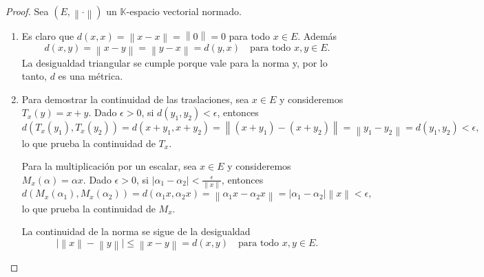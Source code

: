 \documentclass{article}
\theoremstyle{definition}
\newcommand{\norm}[1]{\left\lVert #1 \right\rVert}       %
\newcommand{\EN}[1][E]{(#1,\norm{\cdot})}                 %
\begin{document}
\begin{proof}
    Sea \( \EN \) un \( \mathbb{K} \)-espacio vectorial normado.
    \begin{enumerate}
        \item Es claro que \( d(x, x) = \norm{x-x} = \norm{0} = 0 \) para todo \( x \in E \). Además \[
                  d(x, y) = \norm{x-y} = \norm{y-x} = d(y, x) \quad \text{para todo } x, y \in E.
              \]
              La desigualdad triangular se cumple porque vale para la norma y, por lo tanto, \( d \) es una métrica.
        \item Para demostrar la continuidad de las traslaciones, sea \( x \in E \) y consideremos \( T_x(y) = x + y \). Dado \( \epsilon > 0 \), si \( d(y_1, y_2) < \epsilon \), entonces
              \[
                  d(T_x(y_1), T_x(y_2)) = d(x + y_1, x + y_2) = \norm{(x + y_1) - (x + y_2)} = \norm{y_1 - y_2} = d(y_1, y_2) < \epsilon,
              \]
              lo que prueba la continuidad de \( T_x \).

              Para la multiplicación por un escalar, sea \( x \in E \) y consideremos \( M_x(\alpha) = \alpha x \). Dado \( \epsilon > 0 \), si \( |\alpha_1 - \alpha_2| < \frac{\epsilon}{\norm{x}} \), entonces
              \[
                  d(M_x(\alpha_1), M_x(\alpha_2)) = d(\alpha_1 x, \alpha_2 x) = \norm{\alpha_1 x - \alpha_2 x} = |\alpha_1 - \alpha_2| \norm{x} < \epsilon,
              \]
              lo que prueba la continuidad de \( M_x \).

              La continuidad de la norma se sigue de la desigualdad
              \[
                  \big|\norm{x}-\norm{y}\big|\leq\norm{x-y}=d(x,y) \quad \text{para todo } x,y\in E.
              \]
    \end{enumerate}
\end{proof}

\vspace{0.5cm}
\end{document}
